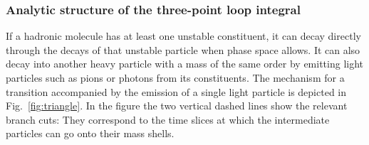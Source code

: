 \subsubsection{Analytic structure of the three-point loop integral}
\label{sec:4-3ploop}


If a hadronic molecule has at least one unstable constituent, it can decay
directly through the decays of that unstable particle when phase space allows.
It can also decay into another heavy particle with a mass of the same order by
emitting light particles such as pions or photons from its constituents. The
mechanism for a transition accompanied by the emission of a single light
particle is depicted in Fig.~\ref{fig:triangle}.
In the figure the two vertical dashed lines show the relevant branch cuts:
They correspond to the time slices at which the intermediate particles can go
onto their mass shells.

